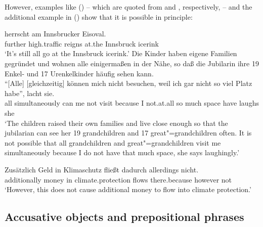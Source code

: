 \noindent
However, examples like () -- which are quoted from
 and , respectively, -- and the additional
example in () show that it is possible in principle:

\eal
\ex
\gll [Weiterhin] [Hochbetrieb] herrscht am Innsbrucker Eisoval.\footnotemark\\
     \spacebr{}further \spacebr{}high.traffic reigns at.the Innsbruck icerink\\
\glt ‘It’s still all go at the Innsbruck icerink.’
\ex Die Kinder haben eigene Familien gegründet und wohnen alle einigermaßen in der Nähe, so daß die Jubilarin ihre 19 Enkel- und 17 Urenkelkinder häufig sehen kann.\\
\gll "`[Alle] [gleichzeitig] können mich nicht besuchen, weil ich {gar nicht} so viel Platz habe"', lacht sie.\footnotemark\\
     \hspaceThis{"`[}all simultaneously can me not visit  because I not.at.all so much space have    laughs she\\      
\glt `The children raised their own families and live close enough so that the jubilarian can see her 19 grandchildren and 17 great"=grandchildren often. It is not possible that all grandchildren and great"=grandchildren visit me simultaneously
because I do not have that much space, she says laughingly.'
\zl

\ea
\gll Zusätzlich   Geld  in Klimaschutz        fließt dadurch       allerdings nicht.\footnotemark\\
     additionally money in climate.protection flows  there.because however    not\\
\glt `However, this does not cause additional money to flow into climate protection.'
\z 








\subsection{Accusative objects and prepositional phrases}

